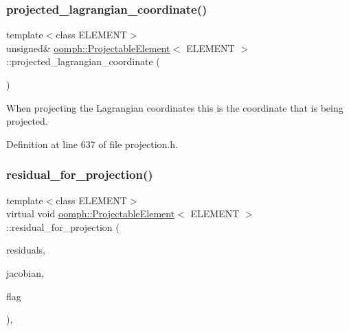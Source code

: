 \subsubsection{\texorpdfstring{projected\+\_\+lagrangian\+\_\+coordinate()}{projected\_lagrangian\_coordinate()}}
{\footnotesize\ttfamily template$<$class E\+L\+E\+M\+E\+NT$>$ \\
unsigned\& \hyperlink{classoomph_1_1ProjectableElement}{oomph\+::\+Projectable\+Element}$<$ E\+L\+E\+M\+E\+NT $>$\+::projected\+\_\+lagrangian\+\_\+coordinate (\begin{DoxyParamCaption}{ }\end{DoxyParamCaption})\hspace{0.3cm}{\ttfamily [inline]}}



When projecting the Lagrangian coordinates this is the coordinate that is being projected. 



Definition at line 637 of file projection.\+h.

\mbox{\label{classoomph_1_1ProjectableElement_a1ff7a9207ec5e4fc2508e75064e136de}} 
\subsubsection{\texorpdfstring{residual\+\_\+for\+\_\+projection()}{residual\_for\_projection()}}
{\footnotesize\ttfamily template$<$class E\+L\+E\+M\+E\+NT$>$ \\
virtual void \hyperlink{classoomph_1_1ProjectableElement}{oomph\+::\+Projectable\+Element}$<$ E\+L\+E\+M\+E\+NT $>$\+::residual\+\_\+for\+\_\+projection (\begin{DoxyParamCaption}\item[{\hyperlink{classoomph_1_1Vector}{Vector}$<$ double $>$ \&}]{residuals,  }\item[{\hyperlink{classoomph_1_1DenseMatrix}{Dense\+Matrix}$<$ double $>$ \&}]{jacobian,  }\item[{const unsigned \&}]{flag }\end{DoxyParamCaption})\hspace{0.3cm}{\ttfamily [inline]}, {\ttfamily [virtual]}}



